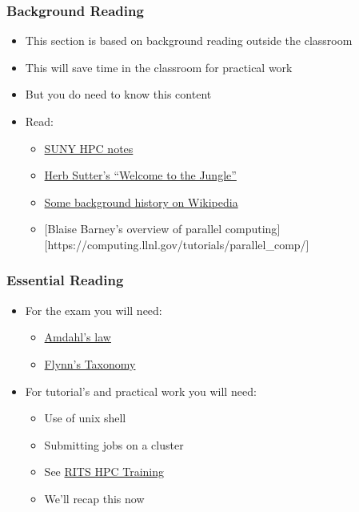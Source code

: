 \subsubsection{Background Reading}\label{background-reading}

\begin{itemize}
\item
  This section is based on background reading outside the classroom
\item
  This will save time in the classroom for practical work
\item
  But you do need to know this content
\item
  Read:

  \begin{itemize}
  \itemsep1pt\parskip0pt
  \item
    \href{https://www.buffalo.edu/content/www/ccr/support/training-resources/tutorials/advanced-topics-{}-e-g-{}-mpi-{}-gpgpu-{}-openmp-{}-etc-{}-/2011-09-{}-{}-parallel-programming-overview-{}-hpc-1-/_jcr_content/par/download/file.res/briefpp-handout-2x2.pdf}{SUNY
    HPC notes}
  \item
    \href{http://herbsutter.com/welcome-to-the-jungle}{Herb Sutter's
    ``Welcome to the Jungle''}
  \item
    \href{http://en.wikipedia.org/wiki/Supercomputer}{Some background
    history on Wikipedia}
  \item
    {[}Blaise Barney's overview of parallel
    computing{]}{[}https://computing.llnl.gov/tutorials/parallel\_comp/{]}
  \end{itemize}
\end{itemize}

\subsubsection{Essential Reading}\label{essential-reading-1}

\begin{itemize}
\itemsep1pt\parskip0pt
\item
  For the exam you will need:

  \begin{itemize}
  \itemsep1pt\parskip0pt
  \item
    \href{https://en.wikipedia.org/wiki/Amdahl\%27s_law}{Amdahl's law}
  \item
    \href{https://en.wikipedia.org/wiki/Flynn\%27s_taxonomy}{Flynn's
    Taxonomy}
  \end{itemize}
\item
  For tutorial's and practical work you will need:

  \begin{itemize}
  \itemsep1pt\parskip0pt
  \item
    Use of unix shell
  \item
    Submitting jobs on a cluster
  \item
    See \href{http://github-pages.ucl.ac.uk/RCPSTrainingMaterials/}{RITS
    HPC Training}
  \item
    We'll recap this now
  \end{itemize}
\end{itemize}

